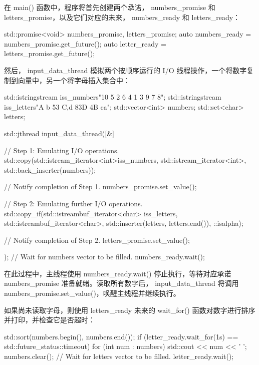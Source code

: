 在 main() 函数中，程序将首先创建两个承诺， numbers\_promise 和 letters\_promise，以及它们对应的未来， numbers\_ready 和 letters\_ready：

\begin{cpp}
std::promise<void> numbers_promise, letters_promise;
auto numbers_ready = numbers_promise.get_future();
auto letter_ready = letters_promise.get_future();
\end{cpp}

然后， input\_data\_thread 模拟两个按顺序运行的 I/O 线程操作，一个将数字复制到向量中，另一个将字母插入集合中：

\begin{cpp}
std::istringstream iss_numbers{"10 5 2 6 4 1 3 9 7 8"};
std::istringstream iss_letters{"A b 53 C,d 83D 4B ca"};
std::vector<int> numbers;
std::set<char> letters;

std::jthread input_data_thread([&] {
    // Step 1: Emulating I/O operations.
    std::copy(std::istream_iterator<int>{iss_numbers},
              std::istream_iterator<int>{},
              std::back_inserter(numbers));

    // Notify completion of Step 1.
    numbers_promise.set_value();

    // Step 2: Emulating further I/O operations.
    std::copy_if(std::istreambuf_iterator<char>
                    {iss_letters},
                 std::istreambuf_iterator<char>{},
                 std::inserter(letters,
                               letters.end()),
                               ::isalpha);

    // Notify completion of Step 2.
    letters_promise.set_value();
});
// Wait for numbers vector to be filled.
numbers_ready.wait();
\end{cpp}

在此过程中，主线程使用 numbers\_ready.wait() 停止执行，等待对应承诺 numbers\_promise 准备就绪。读取所有数字后， input\_data\_thread 将调用 numbers\_promise.set\_value()，唤醒主线程并继续执行。

如果尚未读取字母，则使用 letters\_ready 未来的 wait\_for() 函数对数字进行排序并打印，并检查它是否超时：

\begin{cpp}
std::sort(numbers.begin(), numbers.end());
if (letter_ready.wait_for(1s) == std::future_status::timeout) {
    for (int num : numbers) std::cout << num << ' ';
    numbers.clear();
}
// Wait for letters vector to be filled.
letter_ready.wait();
\end{cpp}

